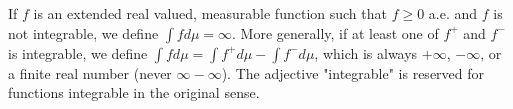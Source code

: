 If $f$ is an extended real valued, measurable function such that $f \geq 0$ a.e. and $f$ is not integrable, we define $\int f d\mu = \infty$. More generally, if at least one of $f^+$ and $f^-$ is integrable, we define $\int f d\mu = \int f^+ d\mu - \int f^- d\mu$, which is always $+\infty$, $-\infty$, or a finite real number (never $\infty - \infty$). The adjective "integrable" is reserved for functions integrable in the original sense.
